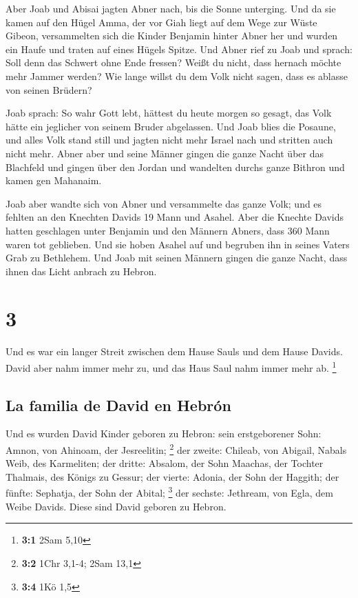 Aber Joab und Abisai jagten Abner nach, bis die Sonne
unterging. Und da sie kamen auf den Hügel Amma, der vor Giah liegt auf
dem Wege zur Wüste Gibeon,  versammelten sich die Kinder
Benjamin hinter Abner her und wurden ein Haufe und traten auf eines
Hügels Spitze.  Und Abner rief zu Joab und sprach: Soll
denn das Schwert ohne Ende fressen? Weißt du nicht, dass hernach möchte
mehr Jammer werden? Wie lange willst du dem Volk nicht sagen, dass es
ablasse von seinen Brüdern?

 Joab sprach: So wahr Gott lebt, hättest du heute morgen
so gesagt, das Volk hätte ein jeglicher von seinem Bruder abgelassen.
 Und Joab blies die Posaune, und alles Volk stand still
und jagten nicht mehr Israel nach und stritten auch nicht mehr.
 Abner aber und seine Männer gingen die ganze Nacht über
das Blachfeld und gingen über den Jordan und wandelten durchs ganze
Bithron und kamen gen Mahanaim.

 Joab aber wandte sich von Abner und versammelte das
ganze Volk; und es fehlten an den Knechten Davids 19 Mann und Asahel.
 Aber die Knechte Davids hatten geschlagen unter Benjamin
und den Männern Abners, dass 360 Mann waren tot geblieben.
 Und sie hoben Asahel auf und begruben ihn in seines
Vaters Grab zu Bethlehem. Und Joab mit seinen Männern gingen die ganze
Nacht, dass ihnen das Licht anbrach zu Hebron.

\hypertarget{section-2}{%
\section{3}\label{section-2}}

 Und es war ein langer Streit zwischen dem Hause Sauls und
dem Hause Davids. David aber nahm immer mehr zu, und das Haus Saul nahm
immer mehr ab. \footnote{\textbf{3:1} 2Sam 5,10}

\hypertarget{la-familia-de-david-en-hebruxf3n}{%
\subsection{La familia de David en
Hebrón}\label{la-familia-de-david-en-hebruxf3n}}

 Und es wurden David Kinder geboren zu Hebron: sein
erstgeborener Sohn: Amnon, von Ahinoam, der Jesreelitin; \footnote{\textbf{3:2}
  1Chr 3,1-4; 2Sam 13,1}  der zweite: Chileab, von
Abigail, Nabals Weib, des Karmeliten; der dritte: Absalom, der Sohn
Maachas, der Tochter Thalmais, des Königs zu Gessur;  der
vierte: Adonia, der Sohn der Haggith; der fünfte: Sephatja, der Sohn der
Abital; \footnote{\textbf{3:4} 1Kö 1,5}  der sechste:
Jethream, von Egla, dem Weibe Davids. Diese sind David geboren zu
Hebron.

